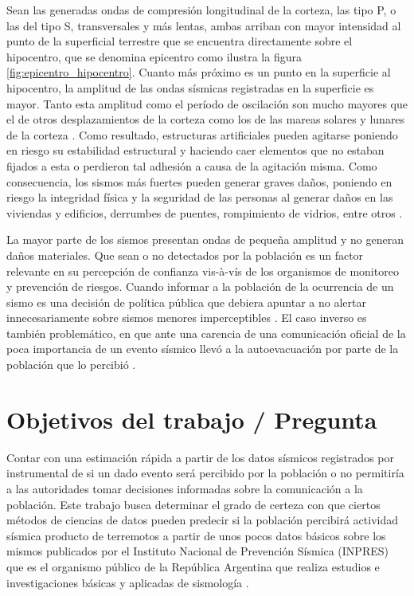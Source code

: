 \documentclass[a4paper]{report}
\begin{document}
Sean las generadas ondas de compresión longitudinal de la corteza, las tipo P, o las del tipo S, transversales y más lentas, ambas arriban con mayor intensidad al punto de la superficial terrestre que se encuentra directamente sobre el hipocentro, que se denomina epicentro \cite[sección 4.1.2]{fowler_solid_1990} como ilustra la figura \ref{fig:epicentro_hipocentro}.
Cuanto más próximo es un punto en la superficie al hipocentro, la amplitud de las ondas sísmicas registradas en la superficie es mayor.
Tanto esta amplitud como el período de oscilación son mucho mayores que el de otros desplazamientos de la corteza como los de las mareas solares y lunares de la corteza \cite[sección 4.1.4]{fowler_solid_1990}.
Como resultado, estructuras artificiales pueden agitarse poniendo en riesgo su estabilidad estructural y haciendo caer elementos que no estaban fijados a esta o perdieron tal adhesión a causa de la agitación misma.
Como consecuencia, los sismos más fuertes pueden generar graves daños, poniendo en riesgo la integridad física y la seguridad de las personas al generar daños en las viviendas y edificios, derrumbes de puentes, rompimiento de vidrios, entre otros \cite{noauthor_que_2018}.

La mayor parte de los sismos presentan ondas de pequeña amplitud y no generan daños materiales.
Que sean o no detectados por la población es un factor relevante en su percepción de confianza vis-à-vís de los organismos de monitoreo y prevención de riesgos.
Cuando informar a la población de la ocurrencia de un sismo es una decisión de política pública que debiera apuntar a no alertar innecesariamente sobre sismos menores imperceptibles \cite{saunders_j_k_twist_nodate}.
El caso inverso es también problemático, en que ante una carencia de una comunicación oficial de la poca importancia de un evento sísmico llevó a la autoevacuación por parte de la población que lo percibió \cite{vaiciulyte_population_2022}. 



\section{Objetivos del trabajo / Pregunta}\label{sec:objetivo}

Contar con una estimación rápida a partir de los datos sísmicos registrados por instrumental de si un dado evento será percibido por la población o no permitiría a las autoridades tomar decisiones informadas sobre la comunicación a la población.
Este trabajo busca determinar el grado de certeza con que ciertos métodos de ciencias de datos pueden predecir si la población percibirá actividad sísmica producto de terremotos a partir de unos pocos datos básicos sobre los mismos publicados por el Instituto Nacional de Prevención Sísmica (INPRES) que es el organismo público de la República Argentina que realiza estudios e investigaciones básicas y aplicadas de sismología \cite{noauthor_instituto_2022}.
\end{document}

